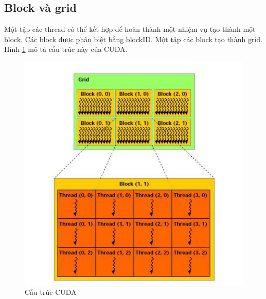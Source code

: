 \documentclass[../../main.tex]{subfiles}
\begin{document}
\subsection*{Block và grid}
Một tập các thread có thể kết hợp để hoàn thành một nhiệm vụ tạo thành một block. Các block được phân biệt bằng blockID. Một tập các block tạo thành grid. 
Hình \ref{fig:cuda-structure} mô tả cấu trúc này của CUDA.
\begin{figure}[H]
    \begin{center}
        \includegraphics[scale=0.6]{CUDA-Grid-Block-Thread-Structure-1-2.png}
    \end{center}
    \caption{Cấu trúc CUDA}
    \label{fig:cuda-structure}
\end{figure}
\end{document}

